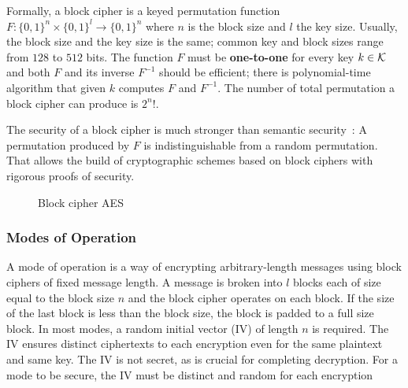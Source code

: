 Formally, a block cipher is a keyed permutation function $F: \{ 0, 1\}^{n} \times \{ 0, 1\}^{l} \rightarrow \{ 0, 1\}^{n}$ where $n$ is the block size and $l$ the key size. Usually, the block size and the key size is the same; common key and block sizes range from $128$ to $512$ bits. The function $F$ must be \textbf{one-to-one} for every key $k \in \mathcal{K}$ and both $F$ and its inverse $F^{-1}$ should be efficient; there is polynomial-time algorithm that given $k$ computes $F$ and $F^{-1}$. The number of total permutation a block cipher can produce is $2^{n}!$.

The security of a block cipher is much stronger than semantic security~\cite{boneh_crypto}: A permutation produced by $F$ is indistinguishable from a random permutation. That allows the build of cryptographic schemes based on block ciphers with rigorous proofs of security.

\begin{figure}[!ht]
    \centering
  \caption{Block cipher AES}
  \label{fig:sym:block:aes}
\end{figure}

\subsubsection[Modes of Operation]{Modes of Operation~\cite{Katz:2014:IMC:2700550}}
\label{preliminaries:sym:modes}

A mode of operation is a way of encrypting arbitrary-length messages using block ciphers of fixed message length. A message is broken into $l$ blocks each of size equal to the block size $n$ and the block cipher operates on each block. If the size of the last block is less than the block size, the block is padded to a full size block. In most modes, a random initial vector (IV) of length $n$ is required. The IV ensures distinct ciphertexts to each encryption even for the same plaintext and same key. The IV is not secret, as is crucial for completing decryption. For a mode to be secure, the IV must be distinct and random for each encryption~\cite{Katz:2014:IMC:2700550}

